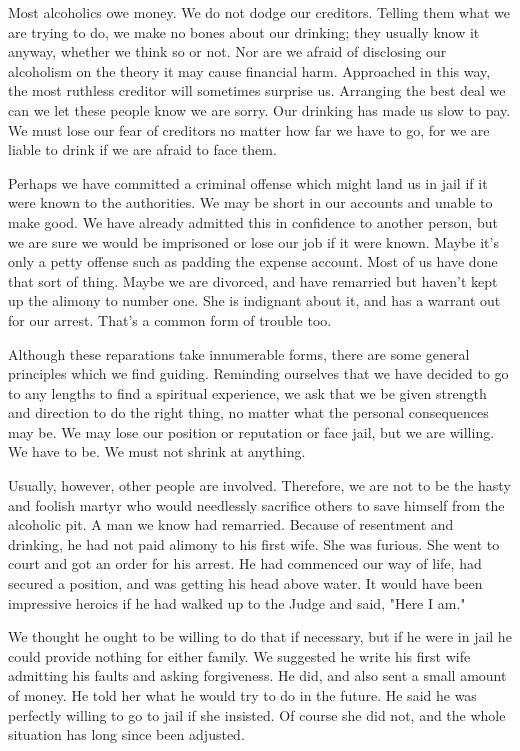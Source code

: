 \begin{biblechapter}
Most alcoholics owe money.  We do not dodge our creditors.  Telling them what we are trying to do, we make no bones about our drinking; they usually know it anyway, whether we think so or not.  Nor are we afraid of disclosing our alcoholism on the theory it may cause financial harm.  Approached in this way, the most ruthless creditor will sometimes surprise us.  Arranging the best deal we can we let these people know we are sorry.  Our drinking has made us slow to pay.  We must lose our fear of creditors no matter how far we have to go, for we are liable to drink if we are afraid to face them.

Perhaps we have committed a criminal offense which might land us in jail if it were known to the authorities.  We may be short in our accounts and unable to make good.  We have already admitted this in confidence to another person, but we are sure we would be imprisoned or lose our job if it were known.  Maybe it's only a petty offense such as padding the expense account.  Most of us have done that sort of thing.  Maybe we are divorced, and have remarried but haven't kept up the alimony to number one.  She is indignant about it, and has a warrant out for our arrest.  That's a common form of trouble too.

Although these reparations take innumerable forms, there are some general principles which we find guiding.  Reminding ourselves that we have decided to go to any lengths to find a spiritual experience, we ask that we be given strength and direction to do the right thing, no matter what the personal consequences may be.  We may lose our position or reputation or face jail, but we are willing.  We have to be.  We must not shrink at anything.

Usually, however, other people are involved.  Therefore, we are not to be the hasty and foolish martyr who would needlessly sacrifice others to save himself from the alcoholic pit.  A man we know had remarried.  Because of resentment and drinking, he had not paid alimony to his first wife.  She was furious.  She went to court and got an order for his arrest.  He had commenced our way of life, had secured a position, and was getting his head above water.  It would have been impressive heroics if he had walked up to the Judge and said, "Here I am."

We thought he ought to be willing to do that if necessary, but if he were in jail he could provide nothing for either family.  We suggested he write his first wife admitting his faults and asking forgiveness.  He did, and also sent a small amount of money.  He told her what he would try to do in the future.  He said he was perfectly willing to go to jail if she insisted.  Of course she did not, and the whole situation has long since been adjusted.


\end{biblechapter}
